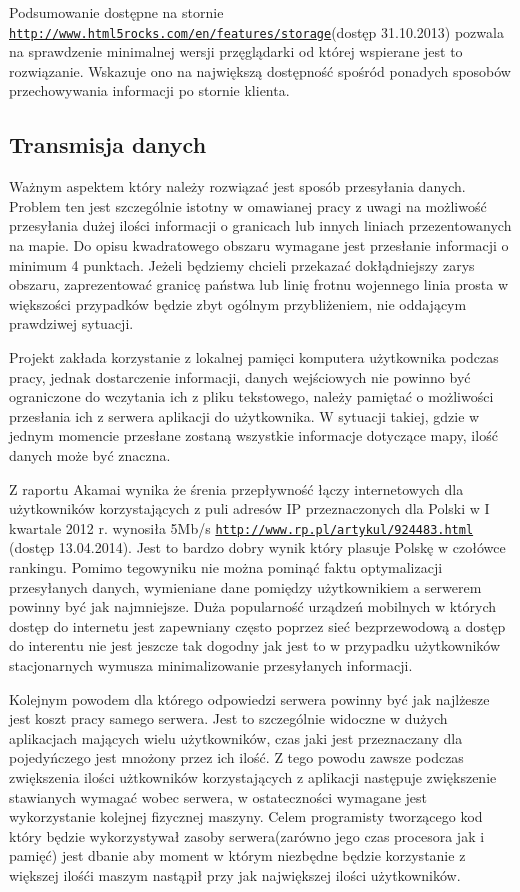 Podsumowanie dostępne na stornie \underline{\texttt{http://www.html5rocks.com/en/features/storage}}(dostęp 31.10.2013) pozwala na sprawdzenie minimalnej wersji przęglądarki od której wspierane jest to rozwiązanie. Wskazuje ono na największą dostępność spośród ponadych sposobów przechowywania informacji po stornie klienta.

\subsection{Transmisja danych}
\label{subsec:transmisjaDanych}

Ważnym aspektem który należy rozwiązać jest sposób przesyłania danych. Problem ten jest szczególnie istotny w omawianej pracy z uwagi na możliwość przesyłania dużej ilości informacji o granicach lub innych liniach przezentowanych na mapie. Do opisu kwadratowego obszaru wymagane jest przesłanie informacji o minimum 4 punktach. Jeżeli będziemy chcieli przekazać dokłądniejszy zarys obszaru, zaprezentować granicę państwa lub linię frotnu wojennego linia prosta w większości przypadków będzie zbyt ogólnym przybliżeniem, nie oddającym prawdziwej sytuacji.

Projekt zakłada korzystanie z lokalnej pamięci komputera użytkownika podczas pracy, jednak dostarczenie informacji, danych wejściowych nie powinno być ograniczone do wczytania ich z pliku tekstowego, należy pamiętać o możliwości przesłania ich z serwera aplikacji do użytkownika. W sytuacji takiej, gdzie w jednym momencie przesłane zostaną wszystkie informacje dotyczące mapy, ilość danych może być znaczna.

Z raportu Akamai wynika że śrenia przepływność łączy internetowych dla użytkowników korzystających z puli adresów IP przeznaczonych dla Polski w I kwartale 2012 r. wynosiła 5Mb/s  \underline{\texttt{http://www.rp.pl/artykul/924483.html}} (dostęp 13.04.2014). Jest to bardzo dobry wynik który plasuje Polskę w czołówce rankingu. Pomimo tegowyniku nie można pominąć faktu optymalizacji przesyłanych danych, wymieniane dane pomiędzy użytkownikiem a serwerem powinny być jak najmniejsze. Duża popularność urządzeń mobilnych w których dostęp do internetu jest zapewniany często poprzez sieć bezprzewodową a dostęp do interentu nie jest jeszcze tak dogodny jak jest to w przypadku użytkowników stacjonarnych  wymusza minimalizowanie przesyłanych informacji.

Kolejnym powodem dla którego odpowiedzi serwera powinny być jak najlżesze jest koszt pracy samego serwera. Jest to szczególnie widoczne w dużych aplikacjach mających wielu użytkowników, czas jaki jest przeznaczany dla pojedyńczego jest mnożony przez ich ilość. Z tego powodu zawsze podczas zwiększenia ilości użtkowników korzystających z aplikacji następuje zwiększenie stawianych wymagać wobec serwera, w ostateczności wymagane jest wykorzystanie kolejnej fizycznej maszyny. Celem programisty tworzącego kod który będzie wykorzystywał zasoby serwera(zarówno jego czas procesora jak i pamięć) jest dbanie aby moment w którym niezbędne będzie korzystanie z większej ilośći maszym nastąpił przy jak największej ilości użytkowników.

